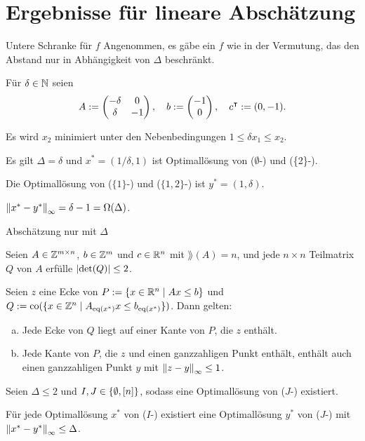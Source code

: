 \section{Ergebnisse für lineare Abschätzung}

\begin{frame}{Untere Schranke für $f$}
	Angenommen, es gäbe ein $f$ wie in der Vermutung, das den Abstand nur in Abhängigkeit von $\Delta$ beschränkt.
	
	\renewcommand{\thisthmnumber}{3.1}
	\begin{beispiel}
	Für $\delta\in\mathbb{N}$ seien
	$$A:=
	\begin{pmatrix}
	-\delta & 0  \\
	\delta  & -1
	\end{pmatrix},\quad
	b:=\begin{pmatrix} -1 \\ 0 \end{pmatrix},\quad
	c^\intercal:=(0, -1).
	$$
	
	\pause
	Es wird $x_2$ minimiert unter den Nebenbedingungen $1\leq\delta x_1\leq x_2$.
	
	\pause
	Es gilt $\Delta=\delta$ und $x^*=(1/\delta,1)$ ist Optimallösung von ($\emptyset$-\MIPI) und (\{2\}-\MIPI).
	
	\pause
	Die Optimallösung von ($\{1\}$-\MIPI) und ($\{1, 2\}$-\MIPI) ist $y^*=(1,\delta)$.
	
	\pause
	$\left\lVert x^*-y^*\right\rVert_\infty=\delta-1=\Omega(\Delta)$.
	\end{beispiel}
\end{frame}

\begin{frame}{Abschätzung nur mit $\Delta$} 
	\renewcommand{\thisthmnumber}{3.3}
	\begin{lem}\label{lem:veselov}
		Seien $A\in\mathbb{Z}^{m\times n}$, $b\in\mathbb{Z}^m$ und $c\in\mathbb{R}^n$ mit $\rang(A)=n$, und jede $n\times n$ Teilmatrix $Q$ von $A$ erfülle $\lvert \det(Q) \rvert\leq 2$.
		
		Seien $z$ eine Ecke von $P:=\{x\in\mathbb{R}^n\mid Ax\leq b \}$ und $Q:=\operatorname{co}(\{x\in\mathbb{Z}^n \mid A_{\operatorname{eq}(x^*)}x \leq b_{\operatorname{eq}(x^*)} \})$.
		Dann gelten:
		\begin{enumerate}[(a)]
			\item Jede Ecke von $Q$ liegt auf einer Kante von $P$, die $z$ enthält.
			\item Jede Kante von $P$, die $z$ und einen ganzzahligen Punkt enthält, enthält auch einen ganzzahligen Punkt $y$ mit $\left\lVert z -y\right\rVert_\infty\leq 1$.
		\end{enumerate}
	\end{lem}
	\pause
	\renewcommand{\thisthmnumber}{3.9}
	\begin{thm}
		Seien $\Delta\leq 2$ und $I,J\in\{\emptyset,[n]\}$, sodass eine Optimallösung von ($J$-\MIPI) existiert.
		
		Für jede Optimallösung $x^*$ von ($I$-\MIPI) existiert eine Optimallösung $y^*$ von ($J$-\MIPI) mit $\left\lVert x^*-y^*\right\rVert_\infty\leq \Delta$.
	\end{thm}
\end{frame}